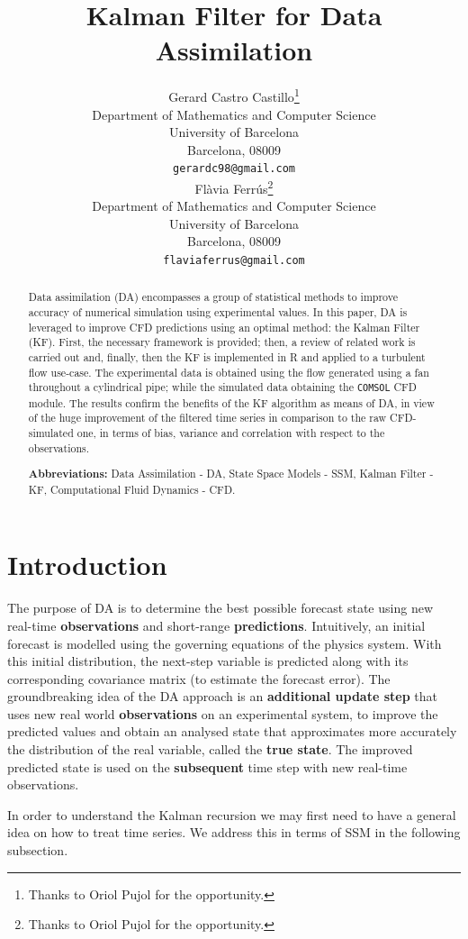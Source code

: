 \documentclass{article}
\title{Kalman Filter for Data Assimilation}
\author{%
  Gerard Castro Castillo\thanks{Thanks to Oriol Pujol for the opportunity.} \\
  Department of Mathematics and Computer Science\\
  University of Barcelona\\
  Barcelona, 08009 \\
  \texttt{gerardc98@gmail.com} \\
  \And
  Flàvia Ferrús\thanks{Thanks to Oriol Pujol for the opportunity.} \\
  Department of Mathematics and Computer Science\\
  University of Barcelona\\
  Barcelona, 08009 \\
  \texttt{flaviaferrus@gmail.com} \\
}
\theoremstyle{definition}
\theoremstyle{definition}
\theoremstyle{remark}
\theoremstyle{mythmstyle}
\begin{document}
\maketitle

\begin{abstract}
  Data assimilation (DA) encompasses a group of statistical methods to improve accuracy of numerical simulation using experimental values. 
  In this paper, DA is leveraged to improve CFD predictions using an optimal method: the Kalman Filter (KF). First, the necessary framework is provided; then, a review of related work is carried out and, finally, then the KF is implemented in R and applied to a turbulent flow use-case. The experimental data is obtained using the flow generated using a fan throughout a cylindrical pipe; while the simulated data obtaining the \texttt{COMSOL} CFD module. 
  The results confirm the benefits of the KF algorithm as means of DA, in view of the huge improvement of the filtered time series in comparison to the raw CFD-simulated one, in terms of bias, variance and correlation with respect to the observations.

  \textbf{Abbreviations:} Data Assimilation - DA, State Space Models - SSM, Kalman Filter - KF, Computational Fluid Dynamics - CFD.
\end{abstract}

\section{Introduction}

The purpose of DA is to determine the best possible forecast state using new real-time \textbf{observations} and short-range \textbf{predictions}. Intuitively, an initial forecast is modelled using the governing equations of the physics system. With this initial distribution, the next-step variable is predicted along with its corresponding covariance matrix (to estimate the forecast error). The groundbreaking idea of the DA approach is an \textbf{additional update step} that uses new real world \textbf{observations} on an experimental system, to improve the predicted values and obtain an analysed state that approximates more accurately the distribution of the real variable, called the \textbf{true state}. The improved predicted state is used on the \textbf{subsequent} time step with new real-time observations.

In order to understand the Kalman recursion we may first need to have a general idea on how to treat time series. We address this in terms of SSM in the following subsection. 
 
\end{document}
